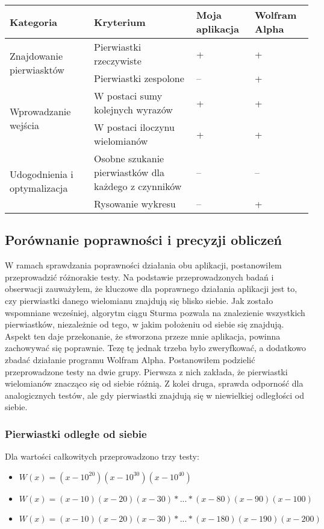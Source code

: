 \documentclass[oneside,a4paper]{book}
\begin{document}
	\begin{center}
		\begin{tabular}{ |p{5cm}|p{5cm}|p{1.5cm}|p{1.5cm}| } 
			\hline
			Kategoria & Kryterium & Moja aplikacja & Wolfram Alpha \\
			\hline
			\multirow{2}{*}{Znajdowanie pierwiasktów}
			& Pierwiastki rzeczywiste & + & + \\
			& Pierwiastki zespolone & -- & + \\
			\hline
			\multirow{2}{*}{Wprowadzanie wejścia}
			&W postaci sumy kolejnych wyrazów & + & + \\
			&W postaci iloczynu wielomianów & + & + \\
			\hline
			\multirow{2}{*}{Udogodnienia i optymalizacja}
			&Osobne szukanie pierwiastków dla każdego z czynników & -- & -- \\
			&Rysowanie wykresu & -- & + \\
			\hline
		\end{tabular}
	\end{center}
	
	\subsection {Porównanie poprawności i precyzji obliczeń}
	
	W ramach sprawdzania poprawności działania obu aplikacji, postanowiłem przeprowadzić różnorakie testy. Na podstawie przeprowadzonych badań i obserwacji zauważyłem, że kluczowe dla poprawnego działania aplikacji jest to, czy pierwiastki danego wielomianu znajdują się blisko siebie. Jak zostało wspomniane wcześniej, algorytm ciągu Sturma pozwala na znalezienie wszystkich pierwiastków, niezależnie od tego, w jakim położeniu od siebie się znajdują. Aspekt ten daje przekonanie, że stworzona przeze mnie aplikacja, powinna zachowywać się poprawnie. Tezę tę jednak trzeba było zweryfkować, a dodatkowo zbadać działanie programu Wolfram Alpha. Postanowiłem podzielić przeprowadzone testy na dwie grupy. Pierwsza z nich zakłada, że pierwiastki wielomianów znacząco się od siebie różnią. Z kolei druga, sprawda odporność dla analogicznych testów, ale gdy pierwiastki znajdują się w niewielkiej odległości od siebie.
	
	\subsubsection {Pierwiastki odległe od siebie}
	
	Dla wartości całkowitych przeprowadzono trzy testy:
	\begin{itemize}
		\item $W(x)=(x-10^{20})(x-10^{30})(x-10^{40})$
		\item $W(x)=(x-10)(x-20)(x-30)*...*(x-80)(x-90)(x-100)$
		\item $W(x)=(x-10)(x-20)(x-30)*...*(x-180)(x-190)(x-200)$
	\end{itemize}
	
\end{document}
